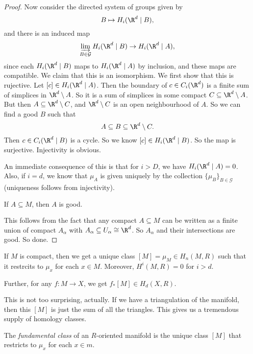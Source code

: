 \documentclass[a4paper]{article}
\begin{document}
\begin{proof}
  Now consider the directed system of groups given by
  \[
    B \mapsto H_i(\R^d \mid B),
  \]
  and there is an induced map
  \[
    \varinjlim_{B \in \mathcal{G}} H_i(\R^d \mid B) \to H_i(\R^d \mid A),
  \]
  since each $H_i(\R^d \mid B)$ maps to $H_i(\R^d \mid A)$ by inclusion, and these maps are compatible. We claim that this is an isomorphism. We first show that this is rujective. Let $[c] \in H_i(\R^d \mid A)$. Then the boundary of $c \in C_i(\R^d)$ is a finite sum of simplices in $\R^d \setminus A$. So it is a sum of simplices in some compact $C \subseteq \R^d \setminus A$. But then $A \subseteq \R^d \setminus C$, and $\R^d \setminus C$ is an open neighbourhood of $A$. So we can find a good $B$ such that
  \[
    A \subseteq B \subseteq \R^d \setminus C.
  \]
  Then $c \in C_i(\R^d \mid B)$ is a cycle. So we know $[c] \in H_i(\R^d \mid B)$. So the map is surjective. Injectivity is obvious.

  An immediate consequence of this is that for $i > D$, we have $H_i(\R^d \mid A) = 0$. Also, if $i = d$, we know that $\mu_A$ is given uniquely by the collection $\{\mu_B\}_{B \in \mathcal{G}}$ (uniqueness follows from injectivity).

  \begin{claim}
    If $A \subseteq M$, then $A$ is good.
  \end{claim}
  This follows from the fact that any compact $A \subseteq M$ can be written as a finite union of compact $A_\alpha$ with $A_\alpha \subseteq U_\alpha \cong \R^d$. So $A_\alpha$ and their intersections are good. So done.
\end{proof}

\begin{cor}
  If $M$ is compact, then we get a unique class $[M] = \mu_M \in H_n(M, R)$ such that it restrcits to $\mu_x$ for each $x \in M$. Moreover, $H^i(M, R) = 0$ for $i > d$.

Further, for any $f: M \to X$, we get $f_*[M] \in H_d(X, R)$.
\end{cor}
This is not too surprising, actually. If we have a triangulation of the manifold, then this $[M]$ is just the sum of all the triangles. This gives us a tremendous supply of homology classes.

\begin{defi}
  The \emph{fundamental class} of an $R$-oriented manifold is the unique class $[M]$ that restricts to $\mu_x$ for each $x \in m$.
\end{defi}
\end{document}
